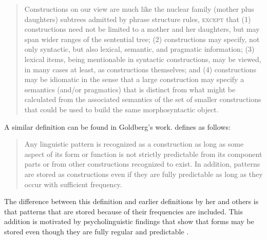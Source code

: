 \documentclass[output=paper]{langsci/langscibook}
\begin{document}
\begin{quote}\label{def-construction-fillmore}
Constructions on our view are much like the nuclear family (mother plus daughters) subtrees
admitted by phrase structure rules, \textsc{except} that (1) constructions need not be limited to a mother
and her daughters, but may span wider ranges of the sentential tree; (2) constructions may specify,
not only syntactic, but also lexical, semantic, and pragmatic information; (3) lexical items,
being mentionable in syntactic constructions, may be viewed, in many cases at least, as
constructions themselves; and (4) constructions may be idiomatic in the sense that a large
construction may specify a semantics (and/or pragmatics) that is distinct from what might be
calculated from the associated semantics of the set of smaller constructions that could be used to
build the same morphosyntactic object. \citep[]{FKoC88a}
\end{quote}
A similar definition can be found in Goldberg's work. \citet[]{Goldberg2006a} defines  as follows:
\begin{quote}
Any linguistic pattern is recognized as a construction as long as some aspect of its form or
function is not strictly predictable from its component parts or from other constructions recognized
to exist. In addition, patterns are stored as constructions even if they are fully predictable as
long as they occur with sufficient frequency. \citep[]{Goldberg2006a}
\end{quote}
The difference between this definition and earlier definitions by her and others is that patterns
that are stored because of their frequencies are included. This addition is motivated by
psycholinguistic findings that show that forms may be stored even though they are fully regular and
predictable \parencites{Bybee95a-u}[]{PJ2005a}.
%
\end{document}

